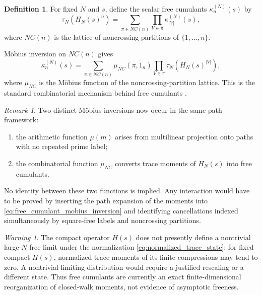 \documentclass[11pt]{amsart}
\numberwithin{equation}{section}
\theoremstyle{plain}
\theoremstyle{definition}
\newtheorem{definition}[theorem]{Definition}
\theoremstyle{remark}
\newtheorem{remark}[theorem]{Remark}
\newtheorem{warning}[theorem]{Warning}
\begin{document}
\begin{definition}
\label{def:free_cumulants_HN}
For fixed $N$ and $s$, define the scalar free cumulants
$\kappa_n^{(N)}(s)$ by
\begin{equation}
\tau_N(H_N(s)^n)
=
\sum_{\pi\in NC(n)}
\prod_{V\in\pi}\kappa_{|V|}^{(N)}(s),
\label{eq:free_moment_cumulant_relation}
\end{equation}
where $NC(n)$ is the lattice of noncrossing partitions of $\{1,\ldots,n\}$.
\end{definition}

M\"obius inversion on $NC(n)$ gives
\begin{equation}
\kappa_n^{(N)}(s)
=
\sum_{\pi\in NC(n)}
\mu_{NC}(\pi,1_n)
\prod_{V\in\pi}
\tau_N(H_N(s)^{|V|}),
\label{eq:free_cumulant_mobius_inversion}
\end{equation}
where $\mu_{NC}$ is the M\"obius function of the noncrossing-partition lattice.  This is the standard combinatorial mechanism behind free cumulants \cite{KrawczykSpeicher2000,NicaSpeicher2006}.

\begin{remark}
\label{rem:two_mobius_functions}
Two distinct M\"obius inversions now occur in the same path framework:
\begin{enumerate}[label=(\roman*)]
\item the arithmetic function $\mu(m)$ arises from multilinear projection onto paths with no repeated prime label;
\item the combinatorial function $\mu_{NC}$ converts trace moments of $H_N(s)$ into free cumulants.
\end{enumerate}
No identity between these two functions is implied.  Any interaction would have to be proved by inserting the path expansion of the moments into \eqref{eq:free_cumulant_mobius_inversion} and identifying cancellations indexed simultaneously by square-free labels and noncrossing partitions.
\end{remark}

\begin{warning}
\label{warn:no_freeness_yet}
The compact operator $H(s)$ does not presently define a nontrivial large-$N$ free limit under the normalization \eqref{eq:normalized_trace_state}; for fixed compact $H(s)$, normalized trace moments of its finite compressions may tend to zero.  A nontrivial limiting distribution would require a justified rescaling or a different state.  Thus free cumulants are currently an exact finite-dimensional reorganization of closed-walk moments, not evidence of asymptotic freeness.
\end{warning}
\end{document}
